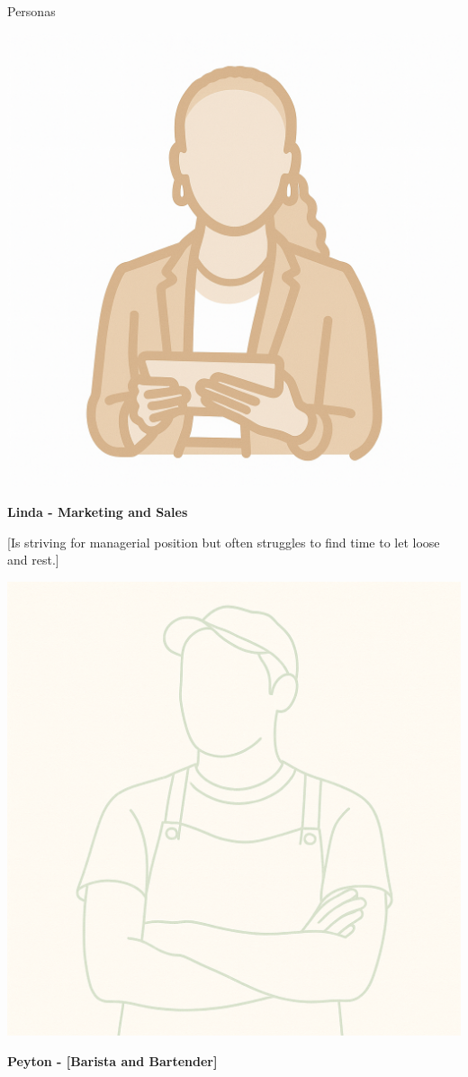 \documentclass[final]{beamer}
\newlength{\colwidth}
\begin{document}
\begin{frame}[t]
\begin{columns}[t]
\begin{column}{\colwidth}
\begin{block}{Personas}
    \begin{minipage}[t]{0.3\linewidth}
      \centering
      \includegraphics[width=0.8\linewidth]{Linda.png}
    \end{minipage}
    \hfill
    \begin{minipage}[t]{0.65\linewidth}
      \textbf{Linda - Marketing and Sales}
      
      [Is striving for managerial position but often struggles to find time to let loose and rest.]
    \end{minipage}

    
    \vspace{0.4cm}
    
    \begin{minipage}[t]{0.3\linewidth}
      \centering
      \includegraphics[width=0.8\linewidth]{Peyton.png}
    \end{minipage}
    \hfill
    \begin{minipage}[t]{0.65\linewidth}
      \textbf{Peyton - [Barista and Bartender]}
      

\end{minipage}
\end{block}
\end{column}
\end{columns}
\end{frame}
\end{document}
